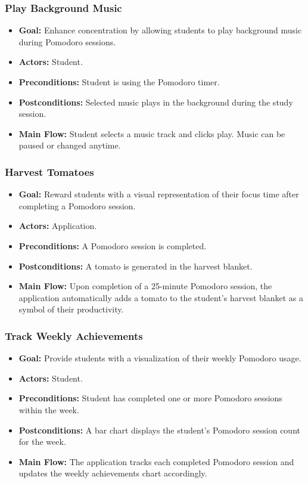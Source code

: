 \documentclass[12pt]{article}
\begin{document}
\subsubsection{Play Background Music}
\begin{itemize}
    \item \textbf{Goal:} Enhance concentration by allowing students to play background music during Pomodoro sessions.
    \item \textbf{Actors:} Student.
    \item \textbf{Preconditions:} Student is using the Pomodoro timer.
    \item \textbf{Postconditions:} Selected music plays in the background during the study session.
    \item \textbf{Main Flow:} Student selects a music track and clicks play. Music can be paused or changed anytime.
\end{itemize}

\subsubsection{Harvest Tomatoes}
\begin{itemize}
    \item \textbf{Goal:} Reward students with a visual representation of their focus time after completing a Pomodoro session.
    \item \textbf{Actors:} Application.
    \item \textbf{Preconditions:} A Pomodoro session is completed.
    \item \textbf{Postconditions:} A tomato is generated in the harvest blanket.
    \item \textbf{Main Flow:} Upon completion of a 25-minute Pomodoro session, the application automatically adds a tomato to the student's harvest blanket as a symbol of their productivity.
\end{itemize}

\subsubsection{Track Weekly Achievements}
\begin{itemize}
    \item \textbf{Goal:} Provide students with a visualization of their weekly Pomodoro usage.
    \item \textbf{Actors:} Student.
    \item \textbf{Preconditions:} Student has completed one or more Pomodoro sessions within the week.
    \item \textbf{Postconditions:} A bar chart displays the student's Pomodoro session count for the week.
    \item \textbf{Main Flow:} The application tracks each completed Pomodoro session and updates the weekly achievements chart accordingly.
\end{itemize}
\end{document}
